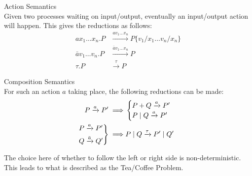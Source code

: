     \begin{definition}{Action Semantics\\}
        Given two processes waiting on input/output, eventually an input/output action will happen.
        This gives the reductions as follows:
        \begin{align*}
            a x_1 \ldots x_n . P        & \xrightarrow{a v_1 \ldots v_n} P\{v_1 / x_1 \ldots v_n / x_n\} \\
            \bar{a} v_1 \ldots v_n . P  & \xrightarrow{\bar{a} v_1 \ldots v_n} P \\
            \tau . P                    & \xrightarrow{\tau} P
        \end{align*}
    \end{definition}


    \begin{definition}{Composition Semantics\\}
        For such an action $a$ taking place, the following reductions can be made:
        \begin{align*}
            P \xrightarrow{a} P' \implies &
            \begin{cases}
                P + Q \xrightarrow{a} P' \\
                P \; | \; Q \xrightarrow{a} P' \\
            \end{cases} \\
            \begin{rcases}
                P \xrightarrow{a} P' \\
                Q \xrightarrow{\bar{a}} Q' \\
            \end{rcases} \implies &
            P \; | \; Q \xrightarrow{\tau} P' \; | \; Q'
        \end{align*}
    \end{definition}
    The choice here of whether to follow the left or right side is non-deterministic.
    This leads to what is described as the Tea/Coffee Problem.


